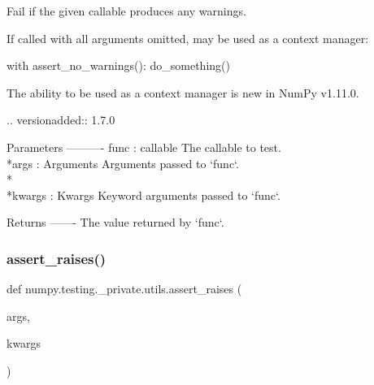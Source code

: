 \begin{DoxyVerb}Fail if the given callable produces any warnings.

If called with all arguments omitted, may be used as a context manager:

    with assert_no_warnings():
        do_something()

The ability to be used as a context manager is new in NumPy v1.11.0.

.. versionadded:: 1.7.0

Parameters
----------
func : callable
    The callable to test.
\\*args : Arguments
    Arguments passed to `func`.
\\*\\*kwargs : Kwargs
    Keyword arguments passed to `func`.

Returns
-------
The value returned by `func`.\end{DoxyVerb}
 \mbox{\label{namespacenumpy_1_1testing_1_1__private_1_1utils_a0cb4ae77f7e52eaa850106e64cadeae0}} 
\subsubsection{\texorpdfstring{assert\+\_\+raises()}{assert\_raises()}}
{\footnotesize\ttfamily def numpy.\+testing.\+\_\+private.\+utils.\+assert\+\_\+raises (\begin{DoxyParamCaption}\item[{}]{args,  }\item[{}]{kwargs }\end{DoxyParamCaption})}

